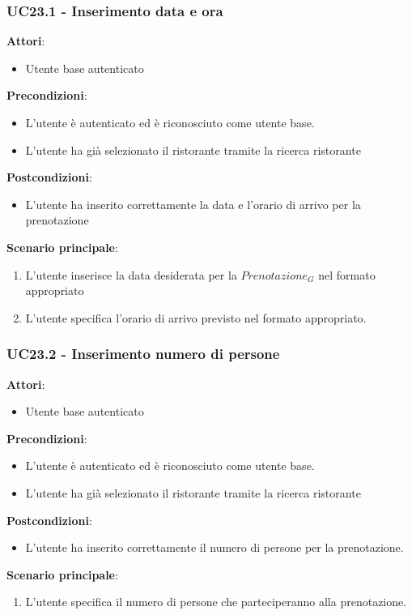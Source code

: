 \subsubsection{UC23.1 - Inserimento data e ora}\label{usecase:23_1}
\textbf{Attori}:
\begin{itemize}
    \item Utente base autenticato
\end{itemize}
\textbf{Precondizioni}:
\begin{itemize}
    \item L'utente è autenticato ed è riconosciuto come utente base.
    \item L'utente ha già selezionato il ristorante tramite la ricerca ristorante 
\end{itemize}
\textbf{Postcondizioni}:
\begin{itemize}
    \item L'utente ha inserito correttamente la data e l'orario di arrivo per la prenotazione
\end{itemize}
\textbf{Scenario principale}:
\begin{enumerate}
    \item L'utente inserisce la data desiderata per la $\textit{Prenotazione}_G$ nel formato appropriato
    \item L'utente specifica l'orario di arrivo previsto nel formato appropriato.
\end{enumerate}



\subsubsection{UC23.2 - Inserimento numero di persone}\label{usecase:23_2}
\textbf{Attori}:
\begin{itemize}
    \item Utente base autenticato
\end{itemize}
\textbf{Precondizioni}:
\begin{itemize}
    \item L'utente è autenticato ed è riconosciuto come utente base.
    \item L'utente ha già selezionato il ristorante tramite la ricerca ristorante 
\end{itemize}
\textbf{Postcondizioni}:
\begin{itemize}
    \item L'utente ha inserito correttamente il numero di persone per la prenotazione.
\end{itemize}
\textbf{Scenario principale}:
\begin{enumerate}
    \item L'utente specifica il numero di persone che parteciperanno alla prenotazione.
\end{enumerate}


